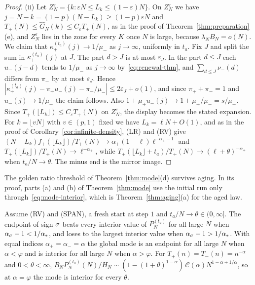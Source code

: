\begin{proof}
(ii) Let $Z^\varepsilon_N=\{k:\varepsilon N\le L_k\le(1-\varepsilon)N\}$. On $Z^\varepsilon_N$ we have
$j=N-k=(1-p)(N-L_k)\ge(1-p)\varepsilon N$ and $T_\plus(N)\le\widehat G_N(k)\le C_\varepsilon T_\plus(N)$,
as in the proof of Theorem~\ref{thm:preparation}(e), and $Z^\varepsilon_N$ lies in the zone
for every $K$ once $N$ is large, because $\lambda_NB_N=o(N)$. We claim that
$\kappa^{(t_a)}_\plus(j)\to1/\mu_\minus$ as $j\to\infty$, uniformly in $t_a$. Fix $J$ and split
the sum in $\kappa^{(t_a)}_\plus(j)$ at $J$. The part $d>J$ is at most $\varepsilon_J$. In the part
$d\le J$ each $u_\minus(j-d)$ tends to $1/\mu_\minus$ as $j\to\infty$ by~\eqref{eq:renewal-thm},
and $\sum_{d\le J}\nu_\minus(d)$ differs from $\pi_\minus$ by at most $\varepsilon_J$. Hence
$|\kappa^{(t_a)}_\plus(j)-\pi_\plus u_\minus(j)-\pi_\minus/\mu_\minus|\le2\varepsilon_J+o(1)$, and
since $\pi_\plus+\pi_\minus=1$ and $u_\minus(j)\to1/\mu_\minus$ the claim follows. Also
$1+\mu_\plus u_\minus(j)\to1+\mu_\plus/\mu_\minus=s/\mu_\minus$. Since
$T_\plus(\lfloor L_k\rfloor)\le C_\varepsilon T_\plus(N)$ on $Z^\varepsilon_N$, the display becomes the
stated expansion. For $k=\lfloor vN\rfloor$ with $v\in(p,1)$ fixed we have $L_k=\ell N+O(1)$, and
as in the proof of Corollary~\ref{cor:infinite-density}, (LR) and (RV) give
$(N-L_k)f_\plus(\lfloor L_k\rfloor)/T_\plus(N)\to\alpha_\plus(1-\ell)\ell^{-\alpha_\plus-1}$ and
$T_\plus(\lfloor L_k\rfloor)/T_\plus(N)\to\ell^{-\alpha_\plus}$, while
$T_\plus(\lfloor L_k\rfloor+t_a)/T_\plus(N)\to(\ell+\theta)^{-\alpha_\plus}$ when $t_a/N\to\theta$. The
minus end is the mirror image.
\end{proof}

The golden ratio threshold of Theorem~\ref{thm:mode}(d) survives aging. In its proof,
parts (a) and (b) of Theorem~\ref{thm:mode} use the initial run only
through~\eqref{eq:mode-interior}, which is Theorem~\ref{thm:aging}(a) for the aged law.

\begin{corollary}\label{cor:aged-mode}
Assume (RV) and (SPAN), a fresh start at step $1$ and $t_a/N\to\theta\in(0,\infty]$. The
endpoint of sign $\sigma$ beats every interior value of $P^{(t_a)}_N$ for all large $N$ when
$\alpha_\sigma-1<1/\alpha_*$, and loses to the largest interior value when
$\alpha_\sigma-1>1/\alpha_*$. With equal indices $\alpha_\plus=\alpha_\minus=\alpha$ the global mode
is an endpoint for all large $N$ when $\alpha<\varphi$ and is interior for all large $N$ when
$\alpha>\varphi$. For $T_\plus(n)=T_\minus(n)=n^{-\alpha}$ and $0<\theta<\infty$,
$B_NP^{(t_a)}_N(N)/H_N\sim(1-(1+\theta)^{1-\alpha})\,\mathcal C(\alpha)N^{1-\alpha+1/\alpha}$, so at
$\alpha=\varphi$ the mode is interior for every $\theta$.
\end{corollary}


